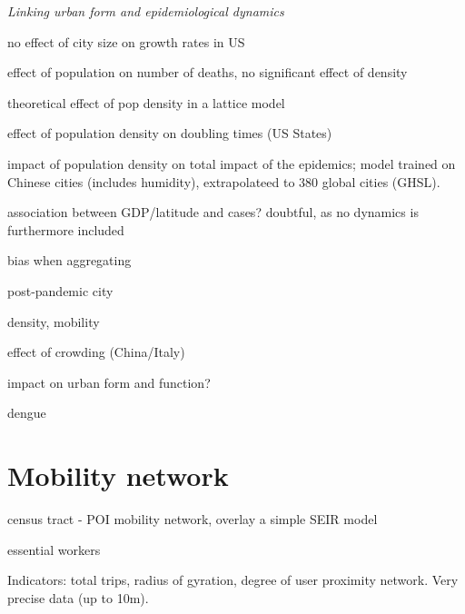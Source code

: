 \documentclass[10pt]{article}
\begin{document}
\textit{Linking urban form and epidemiological dynamics}


\cite{2020arXiv200401248H} no effect of city size on growth rates in US
	
\cite{angel2020coronavirus} effect of population on number of deaths, no significant effect of density

\cite{tarwater2001effects} theoretical effect of pop density in a lattice model	

\cite{White2020.04.14.20065318} effect of population density on doubling times (US States)
	
\cite{Rader2020.04.15.20064980} impact of population density on total impact of the epidemics; model trained on Chinese cities (includes humidity), extrapolateed to 380 global cities (GHSL).

\cite{2020arXiv200400110M} association between GDP/latitude and cases? doubtful, as no dynamics is furthermore included

\cite{2020arXiv200412994B} bias when aggregating

\cite{doi:10.1177/2399808320926912} post-pandemic city

\cite{bouffanais2020cities} density, mobility

	
\cite{rader2020crowding} effect of crowding (China/Italy)
	
\cite{batty2020social} impact on urban form and function?

\cite{huanglarge}

\cite{ivey2020land}

\cite{paez2021reproducibility}

\cite{romeo2021fine} dengue


	
\section{Mobility network}


\cite{ross2021household}

\cite{kim2021impact}

\cite{chang2020mobility} census tract - POI mobility network, overlay a simple SEIR model

\cite{batty2020london} essential workers

	
\cite{Pepe2020.03.22.20039933} Indicators: total trips, radius of gyration, degree of user proximity network. Very precise data (up to 10m).
\end{document}

